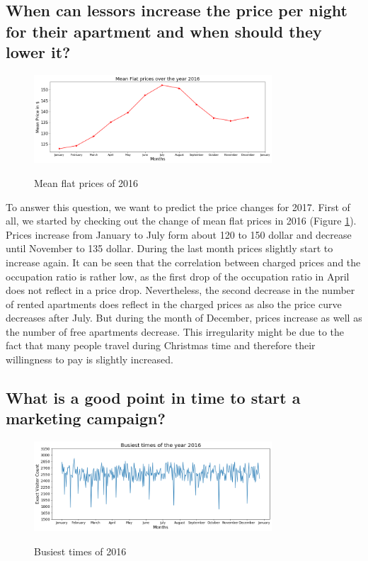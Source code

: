 \documentclass[journal]{IEEEtran}
\begin{document}
\subsection{When can lessors increase the price per night for their apartment and when should they lower it?}

\begin{figure}
  \begin{center}
  \includegraphics[width=3.5in]{photo/12_mean_flat_prices_2016.png}\\
  \caption{Mean flat prices of 2016}\label{mean_flat_prices}
  \end{center}
\end{figure}

To answer this question, we want to predict the price changes for 2017. First of all, we started by checking out the change of mean flat prices in 2016 (Figure \ref{mean_flat_prices}). 
Prices increase from January to July form about 120 to 150 dollar and decrease until November to 135 dollar. During the last month prices slightly start to increase again. It can be seen that the correlation between charged prices and the occupation ratio is rather low, as the first drop of the occupation ratio in April does not reflect in a price drop. Nevertheless, the second decrease in the number of rented apartments does reflect in the charged prices as also the price curve decreases after July. But during the month of December, prices increase as well as the number of free apartments decrease. This irregularity might be due to the fact that many people travel during Christmas time and therefore their willingness to pay is slightly increased. 

\subsection{What is a good point in time to start a marketing campaign?}

\begin{figure}
  \begin{center}
  \includegraphics[width=3.5in]{photo/5_busiest_times_2016.png}\\
  \caption{Busiest times of 2016}\label{busiest_times}
  \end{center}
\end{figure}
\end{document}
